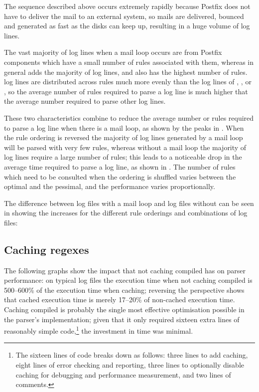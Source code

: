 The sequence described above occurs extremely rapidly because Postfix does
not have to deliver the mail to an external system, so mails are delivered,
bounced and generated as fast as the disks can keep up, resulting in a huge
volume of log lines.

The vast majority of log lines when a mail loop occurs are from Postfix
components which have a small number of rules associated with them, whereas
in general  adds the majority of log lines, and also has the
highest number of rules.   log lines are distributed across
rules much more evenly than the log lines of , ,
 or , so the average number of rules
required to parse a  log line is much higher that the average
number required to parse other log lines.

These two characteristics combine to reduce the average number or rules
required to parse a log line when there is a mail loop, as shown by the
peaks in .
When the rule ordering is reversed the majority of log lines generated by a
mail loop will be parsed with very few rules, whereas without a mail loop
the majority of log lines require a large number of rules; this leads to a
noticeable drop in the average time required to parse a log line, as shown
in .  The number of
rules which need to be consulted when the ordering is shuffled varies
between the optimal and the pessimal, and the performance varies
proportionally.

The difference between log files with a mail loop and log files without can
be seen in  showing the increases for the different rule orderings and
combinations of log files:



\subsection{Caching regexes}

\label{Caching regexes}

The following graphs show the impact that not caching compiled \regexes{}
has on parser performance: on typical log files the execution time when not
caching compiled \regexes{} is 500--600\% of the execution time when
caching; reversing the perspective shows that cached execution time is
merely 17--20\% of non-cached execution time.  Caching compiled \regexes{}
is probably the single most effective optimisation possible in the parser's
implementation; given that it only required sixteen extra lines of
reasonably simple code,\footnote{The sixteen lines of code breaks down as
follows: three lines to add caching, eight lines of error checking and
reporting, three lines to optionally disable caching for debugging and
performance measurement, and two lines of comments.} the investment in time
was minimal.

